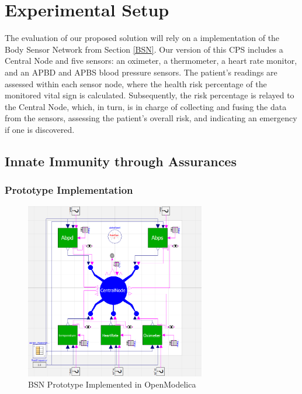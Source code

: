 \section{Experimental Setup}

The evaluation of our proposed solution will rely on a implementation of the Body Sensor Network from Section \ref{BSN}. Our version of this CPS includes a Central Node and five sensors: an oximeter, a thermometer, a heart rate monitor, and an APBD and APBS blood pressure sensors. The patient's readings are assessed within each sensor node, where the health risk percentage of the monitored vital sign is calculated. Subsequently, the risk percentage is relayed to the Central Node, which, in turn, is in charge of collecting and fusing the data from the sensors, assessing the patient's overall risk, and indicating an emergency if one is discovered.

\subsection{Innate Immunity through Assurances}

\subsubsection{Prototype Implementation}

\begin{figure}[!h]
	\centering
	\includegraphics[width=0.7\textwidth, keepaspectratio]{img/BSN_prototype_Modelica.png}
	\caption{BSN Prototype Implemented in OpenModelica}
	\label{fig:BsnProt}
\end{figure}

